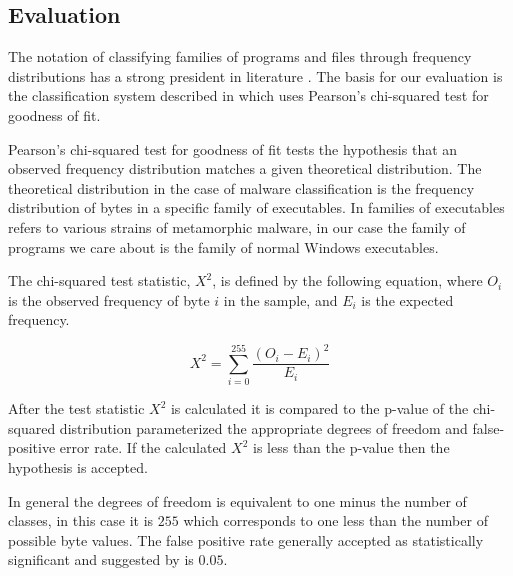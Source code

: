 \documentclass[finalcopy,short]{srpaper}
\begin{document}
        \subsection{Evaluation}
        
        The notation of classifying families of programs and files through
        frequency distributions has a strong president in literature
        \cite{chisquared,hmm_evade,stat_model,fileprints}. The basis for our
        evaluation is the classification system described in \cite{chisquared}
        which uses Pearson's chi-squared test for goodness of fit.

        Pearson's chi-squared test for goodness of fit tests the hypothesis that
        an observed frequency distribution matches a given theoretical
        distribution. The theoretical distribution in the case of malware
        classification is the frequency distribution of bytes in a specific
        family of executables. In \cite{chisquared} families of executables
        refers to various strains of metamorphic malware, in our case the family
        of programs we care about is the family of normal Windows executables.
        

        The chi-squared test statistic, $X^2$, is defined by the following
        equation, where $O_i$ is the observed frequency of byte $i$ in the
        sample, and $E_i$ is the expected frequency.

        $$X^2 = \sum_{i=0}^{255} \frac{(O_i - E_i)^2}{E_i}$$

        After the test statistic $X^2$ is calculated it is compared to the
        p-value of the chi-squared distribution parameterized the appropriate
        degrees of freedom and false-positive error rate. If the calculated
        $X^2$ is less than the p-value then the hypothesis is accepted.

        In general the degrees of freedom is equivalent to one minus the number
        of classes, in this case it is $255$ which corresponds to one less than
        the number of possible byte values\cite{chisquared}. The false positive
        rate generally accepted as statistically significant and suggested by
        \cite{chisquared} is $0.05$.
\end{document}
